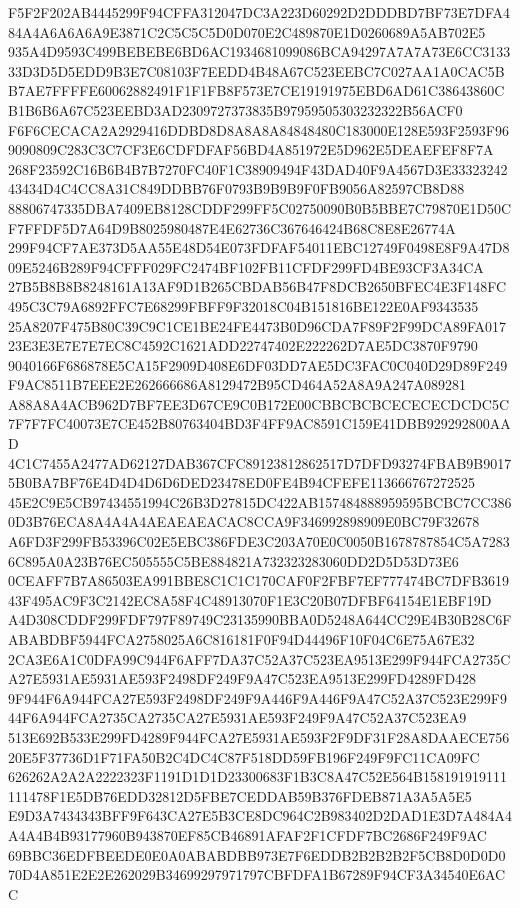 \documentclass[UTF8,fontset=fandol,zihao=-4,a4paper]{ctexart}
\begin{document}
{{F5F2F202AB4445299F94CFFA312047DC3A223D60292D2DDDBD7BF73E7DFA484A4A6A6A6A9E3871C2C5C5C5D0D070E2C489870E1D0260689A5AB702E5
935A4D9593C499BEBEBE6BD6AC1934681099086BCA94297A7A7A73E6CC313333D3D5D5EDD9B3E7C08103F7EEDD4B48A67C523EEBC7C027AA1A0CAC5B
B7AE7FFFFE60062882491F1F1FB8F573E7CE19191975EBD6AD61C38643860CB1B6B6A67C523EEBD3AD2309727373835B97959505303232322B56ACF0
F6F6CECACA2A2929416DDBD8D8A8A8A84848480C183000E128E593F2593F969090809C283C3C7CF3E6CDFDFAF56BD4A851972E5D962E5DEAEFEF8F7A
268F23592C16B6B4B7B7270FC40F1C38909494F43DAD40F9A4567D3E3332324243434D4C4CC8A31C849DDBB76F0793B9B9B9F0FB9056A82597CB8D88
88806747335DBA7409EB8128CDDF299FF5C02750090B0B5BBE7C79870E1D50CF7FFDF5D7A64D9B8025980487E4E62736C367646424B68C8E8E26774A
299F94CF7AE373D5AA55E48D54E073FDFAF54011EBC12749F0498E8F9A47D809E5246B289F94CFFF029FC2474BF102FB11CFDF299FD4BE93CF3A34CA
27B5B8B8B8248161A13AF9D1B265CBDAB56B47F8DCB2650BFEC4E3F148FC495C3C79A6892FFC7E68299FBFF9F32018C04B151816BE122E0AF9343535
25A8207F475B80C39C9C1CE1BE24FE4473B0D96CDA7F89F2F99DCA89FA01723E3E3E7E7E7EC8C4592C1621ADD22747402E222262D7AE5DC3870F9790
9040166F686878E5CA15F2909D408E6DF03DD7AE5DC3FAC0C040D29D89F249F9AC8511B7EEE2E262666686A8129472B95CD464A52A8A9A247A089281
A88A8A4ACB962D7BF7EE3D67CE9C0B172E00CBBCBCBCECECECDCDC5C7F7F7FC40073E7CE452B80763404BD3F4FF9AC8591C159E41DBB929292800AAD
4C1C7455A2477AD62127DAB367CFC89123812862517D7DFD93274FBAB9B90175B0BA7BF76E4D4D4D6D6DED23478ED0FE4B94CFEFE113666767272525
45E2C9E5CB97434551994C26B3D27815DC422AB157484888959595BCBC7CC3860D3B76ECA8A4A4A4AEAEAEACAC8CCA9F346992898909E0BC79F32678
A6FD3F299FB53396C02E5EBC386FDE3C203A70E0C0050B1678787854C5A72836C895A0A23B76EC505555C5BE884821A732323283060DD2D5D53D73E6
0CEAFF7B7A86503EA991BBE8C1C1C170CAF0F2FBF7EF777474BC7DFB361943F495AC9F3C2142EC8A58F4C48913070F1E3C20B07DFBF64154E1EBF19D
A4D308CDDF299FDF797F89749C23135990BBA0D5248A644CC29E4B30B28C6FABABDBF5944FCA2758025A6C816181F0F94D44496F10F04C6E75A67E32
2CA3E6A1C0DFA99C944F6AFF7DA37C52A37C523EA9513E299F944FCA2735CA27E5931AE5931AE593F2498DF249F9A47C523EA9513E299FD4289FD428
9F944F6A944FCA27E593F2498DF249F9A446F9A446F9A47C52A37C523E299F944F6A944FCA2735CA2735CA27E5931AE593F249F9A47C52A37C523EA9
513E692B533E299FD4289F944FCA27E5931AE593F2F9DF31F28A8DAAECE75620E5F37736D1F71FA50B2C4DC4C87F518DD59FB196F249F9FC11CA09FC
626262A2A2A2222323F1191D1D1D23300683F1B3C8A47C52E564B158191919111111478F1E5DB76EDD32812D5FBE7CEDDAB59B376FDEB871A3A5A5E5
E9D3A7434343BFF9F643CA27E5B3CE8DC964C2B983402D2DAD1E3D7A484A4A4A4B4B93177960B943870EF85CB46891AFAF2F1CFDF7BC2686F249F9AC
69BBC36EDFBEEDE0E0A0ABABDBB973E7F6EDDB2B2B2B2F5CB8D0D0D070D4A851E2E2E262029B34699297971797CBFDFA1B67289F94CF3A34540E6ACC
}}
\end{document}
